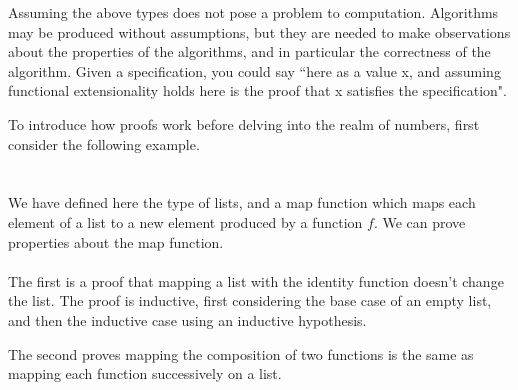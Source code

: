 \documentclass[ProjectReport]{subfiles}
\begin{document}
Assuming the above types does not pose a problem to computation. Algorithms may be produced without assumptions, but they are needed to make observations about the properties of the algorithms, and in particular the correctness of the algorithm. Given a specification, you could say ``here as a value x, and assuming functional extensionality holds here is the proof that x satisfies the specification". 

To introduce how proofs work before delving into the realm of numbers, first consider the following example. \\

\ListDef \\

\MapDef \\

We have defined here the type of lists, and a map function which maps each element of a list to a new element produced by a function $f$. We can prove properties about the map function. \\

\MapProofs \\

The first is a proof that mapping a list with the identity function doesn't change the list. The proof is inductive, first considering the base case of an empty list, and then the inductive case using an inductive hypothesis.

The second proves mapping the composition of two functions is the same as mapping each function successively on a list. 


\begin{comment}
When building a library, certainly many of the initial proofs may be auto-solved by Agda, but in my experience asking Agda to look for a proof results in an indefinite hang due to the size of the terms I am working with. If Agda compiles the code, then I can sure that the proofs I am writing is correct up to the interpretation of the types I write, but I cannot rely on Agda to auto-generate proofs for me.
\end{comment}
\end{document}
